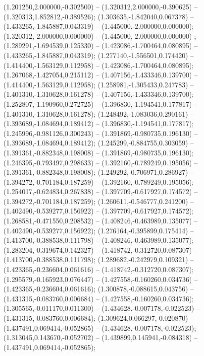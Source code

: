  (1.201250,2.000000,-0.302500) -- (1.320312,2.000000,-0.390625) -- (1.320313,1.852812,-0.389526);
 (1.303635,-1.842040,0.067378) -- (1.433265,-1.845887,0.043319) -- (1.445000,-2.000000,0.000000);
 (1.320312,-2.000000,0.000000) -- (1.445000,-2.000000,0.000000) ;
 (1.289291,-1.694539,0.125330) -- (1.423086,-1.700464,0.080895) -- (1.433265,-1.845887,0.043319);
 (1.277140,-1.556501,0.174420) -- (1.414400,-1.563129,0.112958) -- (1.423086,-1.700464,0.080895);
 (1.267068,-1.427054,0.215112) -- (1.407156,-1.433346,0.139700) -- (1.414400,-1.563129,0.112958);
 (1.258981,-1.305433,0.247783) -- (1.401310,-1.310628,0.161278) -- (1.407156,-1.433346,0.139700);
 (1.252807,-1.190960,0.272725) -- (1.396830,-1.194541,0.177817) -- (1.401310,-1.310628,0.161278);
 (1.248492,-1.083036,0.290161) -- (1.393689,-1.084694,0.189412) -- (1.396830,-1.194541,0.177817);
 (1.245996,-0.981126,0.300243) -- (1.391869,-0.980735,0.196130) -- (1.393689,-1.084694,0.189412);
 (1.245299,-0.884755,0.303059) -- (1.391361,-0.882348,0.198008) -- (1.391869,-0.980735,0.196130);
 (1.246395,-0.793497,0.298633) -- (1.392160,-0.789249,0.195056) -- (1.391361,-0.882348,0.198008);
 (1.249292,-0.706971,0.286927) -- (1.394272,-0.701184,0.187259) -- (1.392160,-0.789249,0.195056);
 (1.254017,-0.624834,0.267838) -- (1.397709,-0.617927,0.174572) -- (1.394272,-0.701184,0.187259);
 (1.260611,-0.546777,0.241200) -- (1.402490,-0.539277,0.156922) -- (1.397709,-0.617927,0.174572);
 (1.268581,-0.471550,0.208532) -- (1.408246,-0.463989,0.135077) -- (1.402490,-0.539277,0.156922);
 (1.276164,-0.395899,0.175414) -- (1.413700,-0.388538,0.111798) -- (1.408246,-0.463989,0.135077);
 (1.283204,-0.319674,0.142327) -- (1.418742,-0.312720,0.087307) -- (1.413700,-0.388538,0.111798);
 (1.289682,-0.242979,0.109321) -- (1.423365,-0.236604,0.061616) -- (1.418742,-0.312720,0.087307);
 (1.295579,-0.165923,0.076447) -- (1.427558,-0.160260,0.034736) -- (1.423365,-0.236604,0.061616);
 (1.300878,-0.088615,0.043756) -- (1.431315,-0.083760,0.006684) -- (1.427558,-0.160260,0.034736);
 (1.305565,-0.011170,0.011300) -- (1.434628,-0.007178,-0.022523) -- (1.431315,-0.083760,0.006684);
 (1.309624,0.066297,-0.020870) -- (1.437491,0.069414,-0.052865) -- (1.434628,-0.007178,-0.022523);
 (1.313045,0.143670,-0.052702) -- (1.439899,0.145941,-0.084318) -- (1.437491,0.069414,-0.052865);
